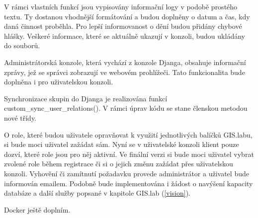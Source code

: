 V rámci vlastních funkcí jsou vypisovány informační logy v podobě prostého textu. Ty dostanou vhodnější formátování a budou doplněny o datum a čas, kdy daná činnost proběhla. Pro lepší informovanost o dění budou přidány chybové hlášky. Veškeré informace, které se aktuálně ukazují v konzoli, budou ukládány do souborů.

Administrátorská konzole, která vychází z konzole Djanga, obsahuje informační zprávy, jež se správci zobrazují ve webovém prohlížeči. Tato funkcionalita bude doplněna i pro uživatelskou konzoli. 

Synchronizace skupin do Djanga je realizována funkcí \textsf{custom\_sync\_user\_relations()}. V rámci úprav kódu se stane členskou metodou nové třídy.

O role, které budou uživatele opravňovat k využití jednotlivých balíčků GIS.labu, si bude moci uživatel zažádat sám. Nyní se v uživatelské konzoli klient pouze dozví, které role jsou pro něj aktivní. Ve finální verzi si bude moci uživatel vybrat zvolené role během registrace či si o jejich změnu zažádat přes uživatelskou konzoli. Vyhovění či zamítnutí požadavku provede administrátor a uživatel bude informován emailem. Podobně bude implementována i žádost o navýšení kapacity databáze a další služby popsané v kapitole GIS.lab (\ref{vision}). 

Docker ještě doplním.